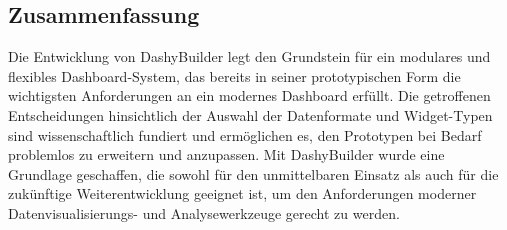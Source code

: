 \documentclass[a4paper, 12pt]{scrartcl}
\begin{document}
\subsection{Zusammenfassung}
Die Entwicklung von DashyBuilder legt den Grundstein für ein modulares und flexibles Dashboard-System, das bereits in seiner prototypischen Form die wichtigsten Anforderungen an ein modernes Dashboard erfüllt. Die getroffenen Entscheidungen hinsichtlich der Auswahl der Datenformate und Widget-Typen sind wissenschaftlich fundiert und ermöglichen es, den Prototypen bei Bedarf problemlos zu erweitern und anzupassen. Mit DashyBuilder wurde eine Grundlage geschaffen, die sowohl für den unmittelbaren Einsatz als auch für die zukünftige Weiterentwicklung geeignet ist, um den Anforderungen moderner Datenvisualisierungs- und Analysewerkzeuge gerecht zu werden.


 

		
    
\intextsep 5pt




\newpage
{}
\setcounter{page}{4}
\printbibliography[heading=bibnumbered, title={Verwendete Literatur}, keyword=verwendet] %

\newpage
\nocite{*} %
\printbibliography[heading=bibnumbered, title={Weiterführende Literatur}, notkeyword=verwendet] %













\end{document}
